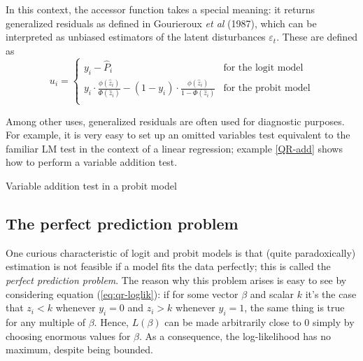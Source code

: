 In this context, the  accessor function takes a
special meaning: it returns generalized residuals as defined in
Gourieroux \textit{et al} (1987), which can be interpreted as unbiased
estimators of the latent disturbances $\varepsilon_t$. These are
defined as
%
\begin{equation}
  \label{eq:QR-genres}
  u_i = \left\{
    \begin{array}{ll}
      y_i - \hat{P}_i & \textrm{for the logit model} \\
      y_i\cdot \frac{\phi(\hat{z}_i)}{\Phi(\hat{z}_i)} - 
      ( 1 - y_i ) \cdot \frac{\phi(\hat{z}_i)}{1 - \Phi(\hat{z}_i)}
      & \textrm{for the probit model} \\
    \end{array}
    \right.
\end{equation}

Among other uses, generalized residuals are often used for diagnostic
purposes.  For example, it is very easy to set up an omitted variables
test equivalent to the familiar LM test in the context of a linear
regression; example \ref{QR-add} shows how to perform a variable
addition test.

\begin{script}[htbp]
  \caption{Variable addition test in a probit model}
  \label{QR-add}
\end{script}

\subsection{The perfect prediction problem}
\label{sec:perfpred}

One curious characteristic of logit and probit models is that (quite
paradoxically) estimation is not feasible if a model fits the data
perfectly; this is called the \emph{perfect prediction problem}. The
reason why this problem arises is easy to see by considering equation
(\ref{eq:qr-loglik}): if for some vector $\beta$ and scalar $k$ it's
the case that $z_i < k$ whenever $y_i=0$ and $z_i > k$ whenever
$y_i=1$, the same thing is true for any multiple of $\beta$. Hence,
$L(\beta)$ can be made arbitrarily close to 0 simply by choosing
enormous values for $\beta$. As a consequence, the log-likelihood has
no maximum, despite being bounded.

